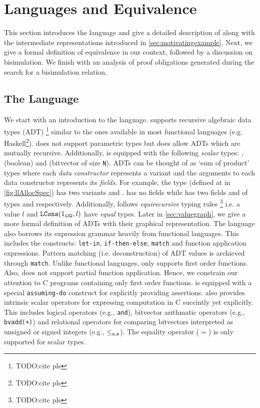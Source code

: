 \section{Languages and Equivalence}
\label{sec:lang-eqdef}

This section introduces the \SpecL{} language and give a detailed description of \SpecL{} along
with the intermediate representations introduced in \cref{sec:motivatingexample}.
Next, we give a formal definition of equivalence in our context, followed by a discussion on bisimulation.
We finish with an analysis of proof obligations generated during the search for a bisimulation relation.

\subsection{The \SpecL{} Language}
\label{sec:speclang}
We start with an introduction to the \SpecL{} language.
\SpecL{} supports recursive algebraic data types (ADT) \footnote{TODO:cite pls} similar to the ones available in most functional languages (e.g. Haskell\footnote{TODO:cite pls}).
\SpecL{} does not support parametric types but does allow ADTs which are mutually recursive.
Additionally, \SpecL{} is equipped with the following {\em scalar} types: ,  (boolean) and  (bitvector of size {\tt N}).
ADTs can be thought of as `sum of product' types where each {\em data constructor} represents a variant
and the arguments to each data constructor represents its {\em fields}.
For example, the  type (defined at  in \cref{fig:llAllocSpec}) has two variants  and .
 has no fields while  has two fields  and  of types  and  respectively.
Additionally, \SpecL{} follows {\em equirecursive} typing rules \footnote{TODO:cite pls} i.e.
a  value $l$ and ${\tt LCons}(1_{\tt i32}, l)$ have {\em equal} types.
Later in \cref{sec:valuegraph}, we give a more formal definition of ADTs with their graphical representation.
The language also borrows its expression grammar heavily from functional languages.
This includes the constructs: {\tt let-in}, {\tt if-then-else}, {\tt match} and function application expressions.
Pattern matching (i.e. deconstruction) of ADT values is archieved through {\tt match}.
Unlike functional languages, \SpecL{} only supports first order functions.
Also, \SpecL{} does not support partial function application.
Hence, we constrain our attention to C programs containing only first order functions.
\SpecL{} is equipped with a special {\tt assuming-do} construct for explicitly providing assertions.
\SpecL{} also provides intrinsic scalar operators for expressing computation in C succintly yet explicitly.
This includes logical operators (e.g., {\tt and}), bitvector arithmatic operators (e.g., {\tt bvadd(+)}) and
relational operators for comparing bitvectors interpreted as unsigned or signed integers (e.g., {\tt $\leq_{\tt u,s}$}).
The equality operator ($=$) is only supported for scalar types.

